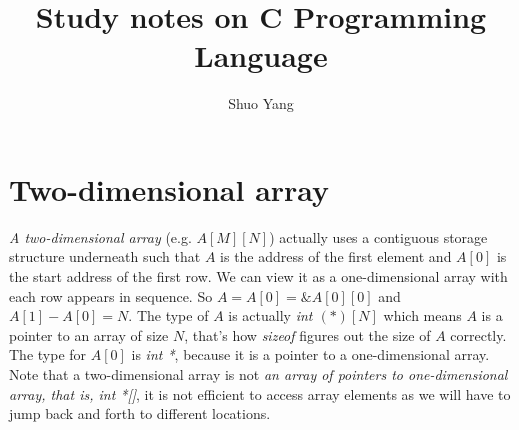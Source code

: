 \documentclass[11pt,a4paper]{article}
\title{Study notes on C Programming Language}
\author{Shuo Yang}
\begin{document}
\maketitle

\section{Two-dimensional array}

\emph{A two-dimensional array} (e.g. $A[M][N]$) actually uses a
contiguous storage structure underneath such that $A$ is the address of the first
element and $A[0]$ is the start address of the first row. We can view
it as a one-dimensional array with each row appears in sequence. So
$A=A[0]=\&A[0][0]$ and $A[1]-A[0]=N$. The type of $A$ is actually 
\emph{int $(*)[N]$} which means $A$ is a pointer to an array of size
$N$, that's how \emph{sizeof} figures out the size of $A$
correctly. The type for $A[0]$ is \emph{int *}, because it is a
pointer to a one-dimensional array. Note that a two-dimensional array
is not \emph{an array of pointers to one-dimensional array, that is,
  int *[]}, it is not efficient to access array elements as we will
have to jump back and forth to different locations.
\end{document}
